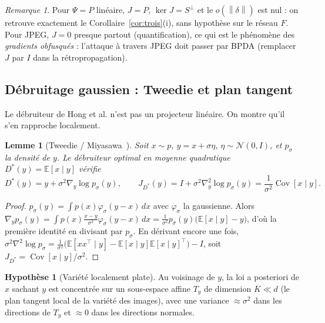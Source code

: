 \documentclass[11pt,a4paper]{article}
\theoremstyle{plain}
\newtheorem{lemma}[theorem]{Lemme}
\theoremstyle{definition}
\newtheorem{assumption}[theorem]{Hypothèse}
\theoremstyle{remark}
\newtheorem{remark}[theorem]{Remarque}
\newcommand{\E}{\mathbb{E}}
\newcommand{\norm}[1]{\left\lVert #1 \right\rVert}
\newcommand{\grad}{\nabla}
\DeclareMathOperator{\Cov}{Cov}
\begin{document}
\begin{remark}
Pour $\Psi=P$ linéaire, $J=P$, $\ker J=S^\perp$ et le $o(\norm\delta)$ est nul : on retrouve
exactement le Corollaire~\ref{cor:trois}(i), sans hypothèse sur le réseau $F$. Pour JPEG,
$J=0$ presque partout (quantification), ce qui est le phénomène des \emph{gradients obfusqués}
\cite{athalye2018} : l'attaque à travers JPEG doit passer par BPDA (remplacer $J$ par $I$ dans la
rétropropagation).
\end{remark}

\subsection{Débruitage gaussien : Tweedie et plan tangent}

Le débruiteur de Hong et al. n'est pas un projecteur linéaire. On montre qu'il s'en rapproche
localement.

\begin{lemma}[Tweedie / Miyasawa~\cite{miyasawa1961,efron2011}]\label{lem:tweedie}
Soit $x\sim p$, $y=x+\sigma\eta$, $\eta\sim\mathcal N(0,I)$, et $p_\sigma$ la densité de $y$. Le
débruiteur optimal en moyenne quadratique $D^*(y)=\E[x\mid y]$ vérifie
\[
D^*(y)=y+\sigma^2\grad_y\log p_\sigma(y),\qquad
J_{D^*}(y)=I+\sigma^2\grad^2_y\log p_\sigma(y)=\frac{1}{\sigma^2}\Cov[x\mid y].
\]
\end{lemma}
\begin{proof}
$p_\sigma(y)=\int p(x)\varphi_\sigma(y-x)\,dx$ avec $\varphi_\sigma$ la gaussienne. Alors
$\grad_y p_\sigma(y)=\int p(x)\frac{x-y}{\sigma^2}\varphi_\sigma(y-x)\,dx=\frac{1}{\sigma^2}p_\sigma(y)\big(\E[x\mid y]-y\big)$,
d'où la première identité en divisant par $p_\sigma$. En dérivant encore une fois,
$\sigma^2\grad^2\log p_\sigma=\frac{1}{\sigma^2}\big(\E[xx^\top\mid y]-\E[x\mid y]\E[x\mid y]^\top\big)-I$,
soit $J_{D^*}=\Cov[x\mid y]/\sigma^2$.
\end{proof}

\begin{assumption}[Variété localement plate]\label{ass:manifold}
Au voisinage de $y$, la loi a posteriori de $x$ sachant $y$ est concentrée sur un sous-espace
affine $T_y$ de dimension $K\ll d$ (le plan tangent local de la variété des images), avec une
variance $\approx\sigma^2$ dans les directions de $T_y$ et $\approx0$ dans les directions
normales.
\end{assumption}
\end{document}
